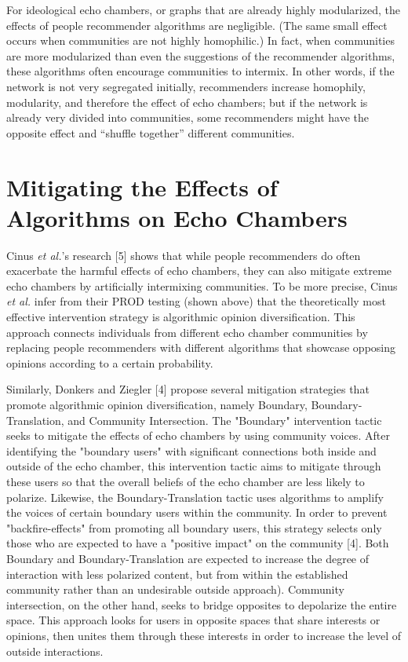 \documentclass[10pt]{article}
\begin{document}
For ideological echo chambers, or graphs that are already highly modularized, the effects of people recommender algorithms are negligible. (The same small effect occurs when communities are not highly homophilic.) In fact, when communities are more modularized than even the suggestions of the recommender algorithms, these algorithms often encourage communities to intermix. In other words, if the network is not very segregated initially, recommenders increase homophily, modularity, and therefore the effect of echo chambers; but if the network is already very divided into communities, some recommenders might have the opposite effect and “shuffle together” different communities. 



\section{Mitigating the Effects of Algorithms on Echo Chambers}
\indent 

Cinus \textit{et al.}'s research [5] shows that while people recommenders do often exacerbate the harmful effects of echo chambers, they can also mitigate extreme echo chambers by artificially intermixing communities. To be more precise, Cinus \textit{et al.} infer from their PROD testing (shown above) that the theoretically most effective intervention strategy is algorithmic opinion diversification. This approach connects individuals from different echo chamber communities by replacing people recommenders with different algorithms that showcase opposing opinions according to a certain probability. 

Similarly, Donkers and Ziegler [4] propose several mitigation strategies that promote algorithmic opinion diversification,  namely Boundary, Boundary- Translation, and Community Intersection. The "Boundary" intervention tactic seeks to mitigate the effects of echo chambers by using community voices. After identifying the "boundary users" with significant connections both inside and outside of the echo chamber, this intervention tactic aims to mitigate through these users so that the overall beliefs of the echo chamber are less likely to polarize. Likewise, the Boundary-Translation tactic uses algorithms to amplify the voices of certain boundary users within the community. In order to prevent "backfire-effects" from promoting all boundary users, this strategy selects only those who are expected to have a "positive impact" on the community [4]. Both Boundary and Boundary-Translation are expected to increase the degree of interaction with less polarized content, but from within the established community rather than an undesirable outside approach). Community intersection, on the other hand, seeks to bridge opposites to depolarize the entire space. This approach looks for users in opposite spaces that share interests or opinions, then unites them through these interests in order to increase the level of outside interactions. 
\end{document}
